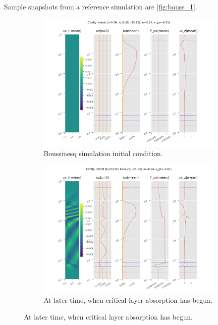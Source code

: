 \documentclass[twocolumn,
        usenames, %
        dvipsnames %
    ]{revtex4-1}%
\begin{document}
Sample snapshots from a reference simulation are \autoref{fig:bouss_1}.
\begin{figure}[h]
    \centering
    \begin{subfigure}{0.5\textwidth}
        \centering
        \includegraphics[width=\textwidth]{plots/vstrat_1.png}
        \caption{Boussinesq simulation initial condition.}
    \end{subfigure}

    \begin{subfigure}{0.5\textwidth}
        \centering
        \includegraphics[width=\textwidth]{plots/vstrat_2.png}
        \caption{At later time, when critical layer absorption has begun.}
    \end{subfigure}


\end{figure}
\end{document}
